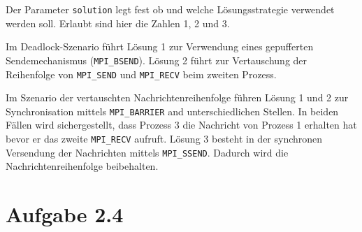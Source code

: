 \documentclass{scrartcl}
\begin{document}
Der Parameter \texttt{solution} legt fest ob und welche
Lösungsstrategie verwendet werden soll. Erlaubt sind hier die Zahlen
1, 2 und 3.



Im Deadlock-Szenario führt Lösung 1 zur Verwendung eines gepufferten
Sendemechanismus (\texttt{MPI\_BSEND}). Lösung 2 führt zur Vertauschung der
Reihenfolge von \texttt{MPI\_SEND} und \texttt{MPI\_RECV} beim zweiten Prozess.

Im Szenario der vertauschten Nachrichtenreihenfolge führen Lösung 1
und 2 zur Synchronisation mittels \texttt{MPI\_BARRIER} and unterschiedlichen Stellen. In beiden Fällen wird sichergestellt, dass Prozess 3 die Nachricht von Prozess 1 erhalten hat bevor er das zweite \texttt{MPI\_RECV} aufruft. Lösung 3 besteht in der synchronen Versendung der Nachrichten mittels \texttt{MPI\_SSEND}. Dadurch wird die Nachrichtenreihenfolge beibehalten.
\section*{Aufgabe 2.4}
\end{document}
